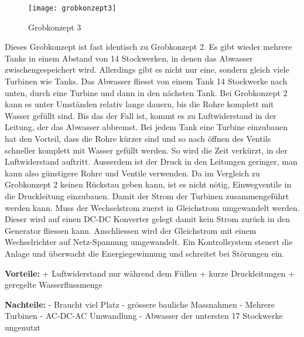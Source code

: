 \begin{wrapfigure}{r}{0.5\textwidth}
  \begin{center}
    \texttt{[image: grobkonzept3]}
  \end{center}
  \caption{Grobkonzept 3}
\end{wrapfigure}

Dieses Grobkonzept ist fast identisch zu Grobkonzept 2. Es gibt wieder mehrere Tanks in einem Abstand von 14 Stockwerken, in denen das Abwasser zwischengespeichert wird. Allerdings gibt es nicht nur eine, sondern gleich viele Turbinen wie Tanks. Das Abwasser fliesst von einem Tank 14 Stockwerke nach unten, durch eine Turbine und dann in den nächsten Tank. Bei Grobkonzept 2 kann es unter Umständen relativ lange dauern, bis die Rohre komplett mit Wasser gefüllt sind. Bis das der Fall ist, kommt es zu Luftwiderstand in der Leitung, der das Abwasser abbremst. Bei jedem Tank eine Turbine einzubauen hat den Vorteil, dass die Rohre kürzer sind und so nach öffnen des Ventils schneller komplett mit Wasser gefüllt werden. So wird die Zeit verkürzt, in der Luftwiderstand auftritt. Ausserdem ist der Druck in den Leitungen geringer, man kann also günstigere Rohre und Ventile verwenden. Da im Vergleich zu Grobkonzept 2 keinen Rückstau geben kann, ist es nicht nötig, Einwegventile in die Druckleitung einzubauen. Damit der Strom der Turbinen zusammengeführt werden kann. Muss der Wechselstrom zuerst in Gleichstrom umgewandelt werden. Dieser wird auf einen DC-DC Konverter gelegt damit kein Strom zurück in den Generator fliessen kann. Anschliessen wird der Gleichstrom mit einem Wechselrichter auf Netz-Spannung umgewandelt. Ein Kontrollsystem steuert die Anlage und überwacht die Energiegewinnung und schreitet bei Störungen ein.

\textbf{Vorteile:} 									\newline
+	Luftwiderstand nur während dem Füllen			\newline
+	kurze Druckleitungen								\newline
+	geregelte Wasserflussmenge						\newline

\textbf{Nachteile:}									\newline
-	Braucht viel Platz								\newline
-	grössere bauliche Massnahmen						\newline
-	Mehrere Turbinen									\newline
-	AC-DC-AC Umwandlung								\newline
-	Abwasser der untersten 17 Stockwerke ungenutzt	\newline
\WFclear			
\newpage